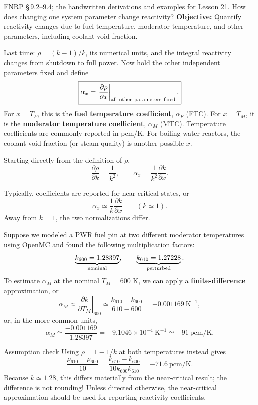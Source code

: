 \documentclass[compact]{ne630handout}
\begin{document}
\NEbody
{}
 {FNRP \S\,9.2--9.4; the handwritten derivations and examples for Lesson 21.}
 {How does changing one system parameter change reactivity?}
\textbf{Objective:} Quantify reactivity changes due to fuel temperature, moderator temperature, and other parameters, including coolant void fraction.

\colstart
{}
Last time: $\rho=(k-1)/k$, its numerical units, and the integral reactivity changes from shutdown to full power. Now hold the other independent parameters fixed and define
$$
 \boxed{\alpha_x=\left.\frac{\partial\rho}{\partial x}
 \right|_{\rm all\ other\ parameters\ fixed}.}
$$
For $x=T_F$, this is the \textbf{fuel temperature coefficient}, $\alpha_F$ (FTC). For $x=T_M$, it is the \textbf{moderator temperature coefficient}, $\alpha_M$ (MTC). Temperature coefficients are commonly reported in pcm/K.  For boiling water reactors, the coolant void fraction (or steam quality) is another possible $x$.

\vspace{10pt}

Starting directly from the definition of $\rho$,
$$
 \frac{\partial\rho}{\partial k}=\frac1{k^2},\qquad
 \alpha_x=\frac1{k^2}\frac{\partial k}{\partial x}.
$$

Typically, coefficients are reported for near-critical states, or
$$\alpha_x\simeq\frac1k\frac{\partial k}{\partial x}\qquad(k\simeq1).$$
Away from $k=1$, the two normalizations differ.

Suppose we modeled a PWR fuel pin at two different
moderator temperatures using OpenMC and found
the following multiplication factors:
$$
 \underbrace{k_{600}=1.28397}_{\rm nominal},\qquad
 \underbrace{k_{610}=1.27228}_{\rm perturbed}.
$$
To estimate $\alpha_M$ at the nominal $T_M=600$ K, we can apply a {\bf finite-difference} approximation, or
$$
 \alpha_M \approx \left.\frac{\partial k}{\partial T_M}\right|_{600}
 \simeq\frac{k_{610}-k_{600}}{610-600}
 =-0.001169\ \mathrm{K}^{-1} ,
$$
or, in the more common units,
$$
 \boxed{\alpha_M\simeq\frac{-0.001169}{1.28397}
 =-9.1046\times10^{-4}\ \mathrm{K}^{-1}
 \simeq-91\ \mathrm{pcm/K}.}
$$

\vspace{10pt}

\begin{KeyBox}{Assumption check}
Using $\rho=1-1/k$ at both temperatures instead gives
$$
 \frac{\rho_{610}-\rho_{600}}{10}
 =\frac{k_{610}-k_{600}}{10k_{600}k_{610}}
 =-71.6\ \mathrm{pcm/K}.
$$
Because $k\simeq1.28$, this differs materially from the near-critical result; the difference is not rounding!  Unless directed otherwise, the near-critical approximation should be used for reporting reactivity coefficients.
\end{KeyBox}
\end{document}
